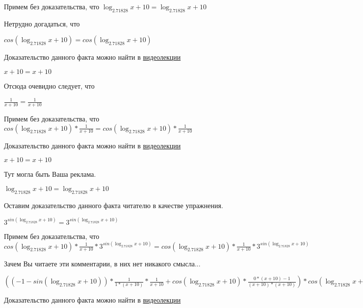 \documentclass[12pt,a4paper,fleqn]{article}
\theoremstyle{definition}
\begin{document}
Примем без доказательства, что
$\log_{ 2.71828 }{ x  +  10 } = \log_{ 2.71828 }{ x  +  10 }$

Нетрудно догадаться, что

$cos(\log_{ 2.71828 }{ x  +  10 }) = cos(\log_{ 2.71828 }{ x  +  10 })$

Доказательство данного факта можно найти в \href{https://www.youtube.com/watch?v=dQw4w9WgXcQ}{видеолекции}

$ x  +  10  =  x  +  10 $

Отсюда очевидно следует, что

$\frac{ 1 }{ x  +  10 }
 = \frac{ 1 }{ x  +  10 }
$

Примем без доказательства, что
$cos(\log_{ 2.71828 }{ x  +  10 }) * \frac{ 1 }{ x  +  10 }
 = cos(\log_{ 2.71828 }{ x  +  10 }) * \frac{ 1 }{ x  +  10 }
$

Доказательство данного факта можно найти в \href{https://www.youtube.com/watch?v=dQw4w9WgXcQ}{видеолекции}

$ x  +  10  =  x  +  10 $

Тут могла быть Ваша реклама.

$\log_{ 2.71828 }{ x  +  10 } = \log_{ 2.71828 }{ x  +  10 }$

Оставим доказательство данного факта читателю в качестве упражнения.

${ 3 }^{sin(\log_{ 2.71828 }{ x  +  10 })} = { 3 }^{sin(\log_{ 2.71828 }{ x  +  10 })}$

Примем без доказательства, что
$cos(\log_{ 2.71828 }{ x  +  10 }) * \frac{ 1 }{ x  +  10 }
 * { 3 }^{sin(\log_{ 2.71828 }{ x  +  10 })} = cos(\log_{ 2.71828 }{ x  +  10 }) * \frac{ 1 }{ x  +  10 }
 * { 3 }^{sin(\log_{ 2.71828 }{ x  +  10 })}$

Зачем Вы читаете эти комментарии, в них нет никакого смысла...

$(( -1  - sin(\log_{ 2.71828 }{ x  +  10 })) * \frac{ 1 }{ 1  * ( x  +  10 )}
 * \frac{ 1 }{ x  +  10 }
 + cos(\log_{ 2.71828 }{ x  +  10 }) * \frac{ 0  * ( x  +  10 ) -  1 }{( x  +  10 ) * ( x  +  10 )}
) * cos(\log_{ 2.71828 }{ x  +  10 }) * \frac{ 1 }{ x  +  10 }
 * { 3 }^{sin(\log_{ 2.71828 }{ x  +  10 })} = (( -1  - sin(\log_{ 2.71828 }{ x  +  10 })) * \frac{ 1 }{ 1  * ( x  +  10 )}
 * \frac{ 1 }{ x  +  10 }
 + cos(\log_{ 2.71828 }{ x  +  10 }) * \frac{ 0  * ( x  +  10 ) -  1 }{( x  +  10 ) * ( x  +  10 )}
) * cos(\log_{ 2.71828 }{ x  +  10 }) * \frac{ 1 }{ x  +  10 }
 * { 3 }^{sin(\log_{ 2.71828 }{ x  +  10 })}$

Доказательство данного факта можно найти в \href{https://www.youtube.com/watch?v=dQw4w9WgXcQ}{видеолекции}
\end{document}

